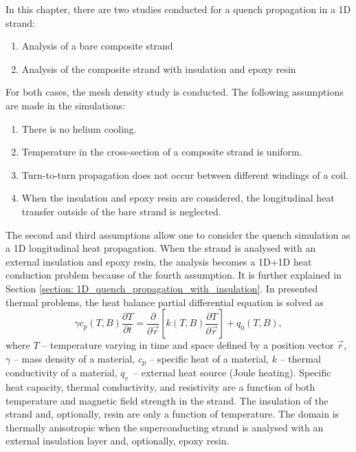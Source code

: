 
In this chapter, there are two studies conducted for a quench propagation in a 1D strand: 

\begin{enumerate}
    \item Analysis of a bare composite strand
    \item Analysis of the composite strand with insulation and epoxy resin
\end{enumerate}

For both cases, the mesh density study is conducted. The following assumptions are made in the simulations: 

\begin{enumerate}
    \item There is no helium cooling.
    \item Temperature in the cross-section of a composite strand is uniform.
    \item Turn-to-turn propagation does not occur between different windings of a coil.
    \item When the insulation and epoxy resin are considered, the longitudinal heat transfer outside of the bare strand is neglected.
\end{enumerate}

The second and third assumptions allow one to consider the quench simulation as a 1D longitudinal heat propagation. When the strand is analysed with an external insulation and epoxy resin, the analysis becomes a 1D+1D heat conduction problem because of the fourth assumption. It is further explained in Section \ref{section: 1D_quench_propagation_with_insulation}. In presented thermal problems, the heat balance partial differential equation is solved as
\begin{equation}
    \gamma c_p(T,B) \frac{\partial T}{\partial t} = \frac{\partial}{\partial \vec{r}}[k(T,B) \frac{\partial T}{\partial \vec{r}}] + q_0(T,B),
    \label{eqn:PDE_heat_balance}
\end{equation}
where $T$ -- temperature varying in time and space defined by a position vector $\vec{r}$, $\gamma$ -- mass density of a material, $c_p$ -- specific heat of a material, $k$ -- thermal conductivity of a material, $q_v$~-- external heat source (Joule heating). Specific heat capacity, thermal conductivity, and resistivity are a function of both temperature and magnetic field strength in the strand. The insulation of the strand and, optionally, resin are only a function of temperature. The domain is thermally anisotropic when the superconducting strand is analysed with an external insulation layer and, optionally, epoxy resin.